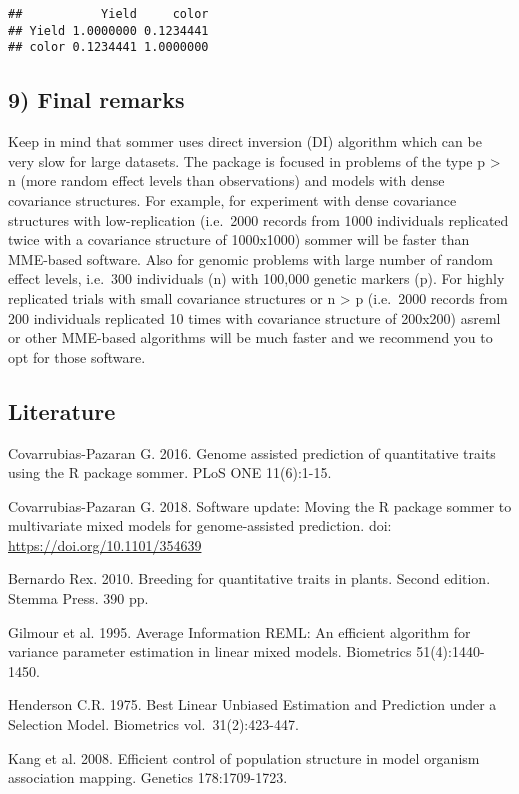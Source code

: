 \documentclass[]{article}
\begin{document}
\begin{verbatim}
##           Yield     color
## Yield 1.0000000 0.1234441
## color 0.1234441 1.0000000
\end{verbatim}

\subsection{9) Final remarks}\label{final-remarks}

Keep in mind that sommer uses direct inversion (DI) algorithm which can
be very slow for large datasets. The package is focused in problems of
the type p \textgreater{} n (more random effect levels than
observations) and models with dense covariance structures. For example,
for experiment with dense covariance structures with low-replication
(i.e.~2000 records from 1000 individuals replicated twice with a
covariance structure of 1000x1000) sommer will be faster than MME-based
software. Also for genomic problems with large number of random effect
levels, i.e.~300 individuals (n) with 100,000 genetic markers (p). For
highly replicated trials with small covariance structures or n
\textgreater{} p (i.e.~2000 records from 200 individuals replicated 10
times with covariance structure of 200x200) asreml or other MME-based
algorithms will be much faster and we recommend you to opt for those
software.

\subsection{Literature}\label{literature}

Covarrubias-Pazaran G. 2016. Genome assisted prediction of quantitative
traits using the R package sommer. PLoS ONE 11(6):1-15.

Covarrubias-Pazaran G. 2018. Software update: Moving the R package
sommer to multivariate mixed models for genome-assisted prediction. doi:
\url{https://doi.org/10.1101/354639}

Bernardo Rex. 2010. Breeding for quantitative traits in plants. Second
edition. Stemma Press. 390 pp.

Gilmour et al. 1995. Average Information REML: An efficient algorithm
for variance parameter estimation in linear mixed models. Biometrics
51(4):1440-1450.

Henderson C.R. 1975. Best Linear Unbiased Estimation and Prediction
under a Selection Model. Biometrics vol.~31(2):423-447.

Kang et al. 2008. Efficient control of population structure in model
organism association mapping. Genetics 178:1709-1723.
\end{document}
